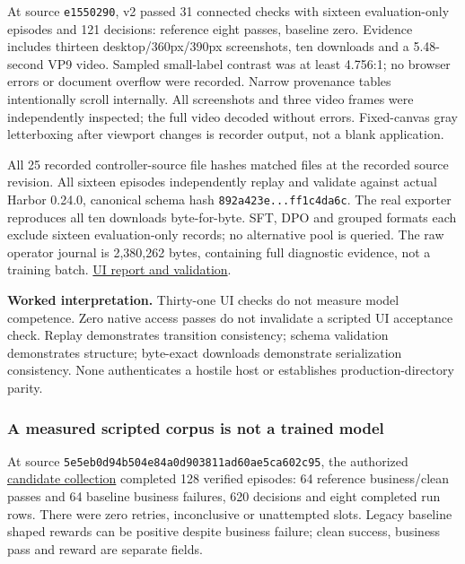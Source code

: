 \documentclass[
  11pt,
  letterpaper,
]{article}
\begin{document}
At source \texttt{e1550290}, v2 passed 31 connected checks with sixteen
evaluation-only episodes and 121 decisions: reference eight passes,
baseline zero. Evidence includes thirteen desktop/360px/390px
screenshots, ten downloads and a 5.48-second VP9 video. Sampled
small-label contrast was at least 4.756:1; no browser errors or document
overflow were recorded. Narrow provenance tables intentionally scroll
internally. All screenshots and three video frames were independently
inspected; the full video decoded without errors. Fixed-canvas gray
letterboxing after viewport changes is recorder output, not a blank
application.

All 25 recorded controller-source file hashes matched files at the
recorded source revision. All sixteen episodes independently replay and
validate against actual Harbor 0.24.0, canonical schema hash
\texttt{892a423e...ff1c4da6c}. The real exporter reproduces all ten
downloads byte-for-byte. SFT, DPO and grouped formats each exclude
sixteen evaluation-only records; no alternative pool is queried. The raw
operator journal is 2,380,262 bytes, containing full diagnostic
evidence, not a training batch.
\href{../../artifacts/access-provisioning/20261010-ui-v2/independent-validation.json}{UI
report and validation}.

\textbf{Worked interpretation.} Thirty-one UI checks do not measure
model competence. Zero native access passes do not invalidate a scripted
UI acceptance check. Replay demonstrates transition consistency; schema
validation demonstrates structure; byte-exact downloads demonstrate
serialization consistency. None authenticates a hostile host or
establishes production-directory parity.

\subsubsection{A measured scripted corpus is not a trained
model}\label{a-measured-scripted-corpus-is-not-a-trained-model}

At source \texttt{5e5eb0d94b504e84a0d903811ad60ae5ca602c95}, the
authorized
\href{../../artifacts/candidate-corpus/20261010-v1/manifest.json}{candidate
collection} completed 128 verified episodes: 64 reference business/clean
passes and 64 baseline business failures, 620 decisions and eight
completed run rows. There were zero retries, inconclusive or unattempted
slots. Legacy baseline shaped rewards can be positive despite business
failure; clean success, business pass and reward are separate fields.
\end{document}
